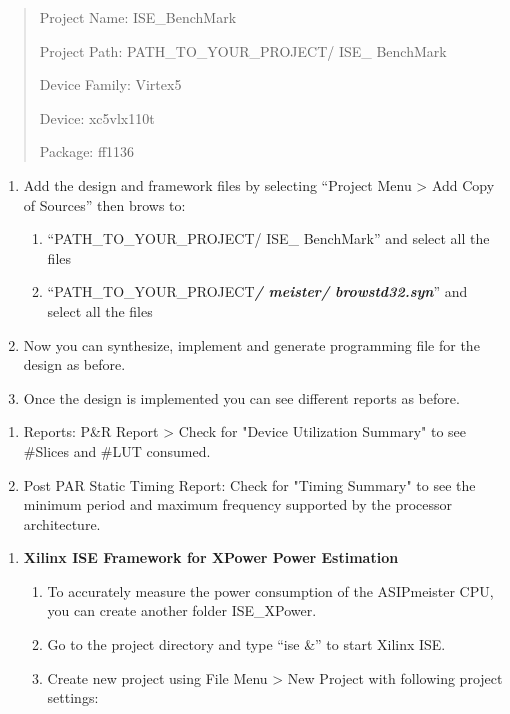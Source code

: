 \documentclass[
]{article}
\begin{document}
\begin{quote}
Project Name: ISE\_BenchMark

Project Path: PATH\_TO\_YOUR\_PROJECT/ ISE\_ BenchMark

Device Family: Virtex5

Device: xc5vlx110t

Package: ff1136
\end{quote}

\begin{enumerate}
\def\labelenumi{\arabic{enumi}.}
\setcounter{enumi}{3}
\item
  Add the design and framework files by selecting ``Project Menu
  \textgreater{} Add Copy of Sources'' then brows to:

  \begin{enumerate}
  \def\labelenumii{\arabic{enumii}.}
  \item
    ``PATH\_TO\_YOUR\_PROJECT/ ISE\_ BenchMark'' and select all the
    files
  \item
    ``PATH\_TO\_YOUR\_PROJECT\emph{\textbf{/ meister/ browstd32.syn}}''
    and select all the files
  \end{enumerate}
\item
  Now you can synthesize, implement and generate programming file for
  the design as before.
\item
  Once the design is implemented you can see different reports as
  before.
\end{enumerate}

\begin{enumerate}
\def\labelenumi{\alph{enumi}.}
\item
  Reports: P\&R Report \textgreater{} Check for "Device Utilization
  Summary" to see \#Slices and \#LUT consumed.
\item
  Post PAR Static Timing Report: Check for "Timing Summary" to see the
  minimum period and maximum frequency supported by the processor
  architecture.
\end{enumerate}

\begin{enumerate}
\def\labelenumi{\arabic{enumi}.}
\setcounter{enumi}{4}
\item
  \textbf{Xilinx ISE Framework for XPower Power Estimation}

  \begin{enumerate}
  \def\labelenumii{\arabic{enumii}.}
  \item
    To accurately measure the power consumption of the ASIPmeister CPU,
    you can create another folder ISE\_XPower.
  \item
    Go to the project directory and type ``ise \&'' to start Xilinx ISE.
  \item
    Create new project using File Menu \textgreater{} New Project with
    following project settings:
  \end{enumerate}
\end{enumerate}
\end{document}

